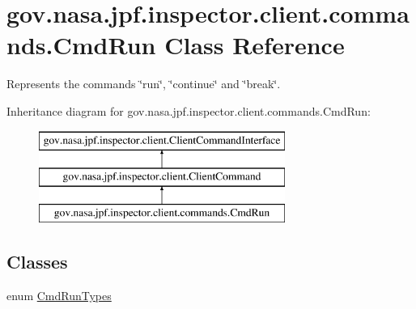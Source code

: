 \hypertarget{classgov_1_1nasa_1_1jpf_1_1inspector_1_1client_1_1commands_1_1_cmd_run}{}\section{gov.\+nasa.\+jpf.\+inspector.\+client.\+commands.\+Cmd\+Run Class Reference}
\label{classgov_1_1nasa_1_1jpf_1_1inspector_1_1client_1_1commands_1_1_cmd_run}


Represents the commands \char`\"{}run\char`\"{}, \char`\"{}continue\char`\"{} and \char`\"{}break\char`\"{}.  


Inheritance diagram for gov.\+nasa.\+jpf.\+inspector.\+client.\+commands.\+Cmd\+Run\+:\begin{figure}[H]
\begin{center}
\leavevmode
\includegraphics[height=3.000000cm]{classgov_1_1nasa_1_1jpf_1_1inspector_1_1client_1_1commands_1_1_cmd_run}
\end{center}
\end{figure}
\subsection*{Classes}
\begin{DoxyCompactItemize}
\item 
enum \hyperlink{enumgov_1_1nasa_1_1jpf_1_1inspector_1_1client_1_1commands_1_1_cmd_run_1_1_cmd_run_types}{Cmd\+Run\+Types}
\end{DoxyCompactItemize}
